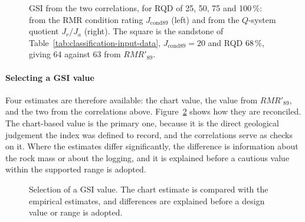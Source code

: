 \begin{figure}[htbp]
\centering
{}
\caption{GSI from the two correlations, for RQD of 25, 50, 75 and 100\,\%: from the RMR condition rating $J_{\mathrm{cond89}}$ (left) and from the $Q$-system quotient $J_r/J_a$ (right). The square is the sandstone of Table~\ref{tab:classification-input-data}, $J_{\mathrm{cond89}} = 20$ and RQD 68\,\%, giving 64 against 63 from $RMR'_{89}$.}
\label{fig:gsi-correlations}
\end{figure}

\paragraph{Selecting a GSI value}
Four estimates are therefore available: the chart value, the value from
\(RMR'_{89}\), and the two from the correlations above.
Figure~\ref{fig:gsi_selection} shows how they are reconciled. The chart-based
value is the primary one, because it is the direct geological judgement the
index was defined to record, and the correlations serve as checks on it. Where
the estimates differ significantly, the difference is information about
the rock mass or about the logging, and it is explained before a cautious
value within the supported range is adopted.

\begin{figure}[htbp]
\centering
{}
\caption{Selection of a GSI value. The chart estimate is compared with the empirical estimates, and differences are explained before a design value or range is adopted.}
\label{fig:gsi_selection}
\end{figure}

